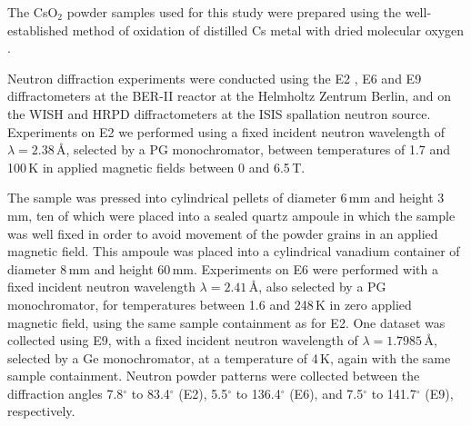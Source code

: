 \documentclass[prb,aps,twocolumn,superscriptaddress,showpacs,footinbib]{revtex4-2}
\newcommand{\cso}{CsO$_{2}$ }
\begin{document}
The \cso powder samples used for this study were prepared using the well-established method of oxidation of distilled Cs metal with dried molecular oxygen \cite{Helms1939}.

Neutron diffraction experiments were conducted using the E2 \cite{E2ref}, E6 and E9 \cite{E9ref} diffractometers at the BER-II reactor at the Helmholtz Zentrum Berlin, and on the WISH \cite{WISH-tech} and HRPD \cite{HRPD-tech} diffractometers at the ISIS spallation neutron source. Experiments on E2 we performed using a fixed incident neutron wavelength of $\lambda = 2.38$\,\AA, selected by a PG monochromator, between temperatures of 1.7 and 100\,K in applied magnetic fields between 0 and 6.5\,T.

The sample was pressed into cylindrical pellets of diameter 6\,mm and height 3\,mm, ten of which were placed into a sealed quartz ampoule in which the sample was well fixed in order to avoid movement of the powder grains in an applied magnetic field. This ampoule was placed into a cylindrical vanadium container of diameter 8\,mm and height 60\,mm. Experiments on E6 were performed with a fixed incident neutron wavelength $\lambda = 2.41$\,\AA, also selected by a PG monochromator, for temperatures between 1.6 and 248\,K in zero applied magnetic field, using the same sample containment as for E2. One dataset was collected using E9, with a fixed incident neutron wavelength of $\lambda = 1.7985$\,\AA, selected by a Ge monochromator, at a temperature of 4\,K, again with the same sample containment. Neutron powder patterns were collected between the diffraction angles 7.8$^{\circ}$ to 83.4$^{\circ}$ (E2), 5.5$^{\circ}$ to 136.4$^{\circ}$ (E6), and 7.5$^{\circ}$ to 141.7$^{\circ}$ (E9), respectively.
\end{document}
